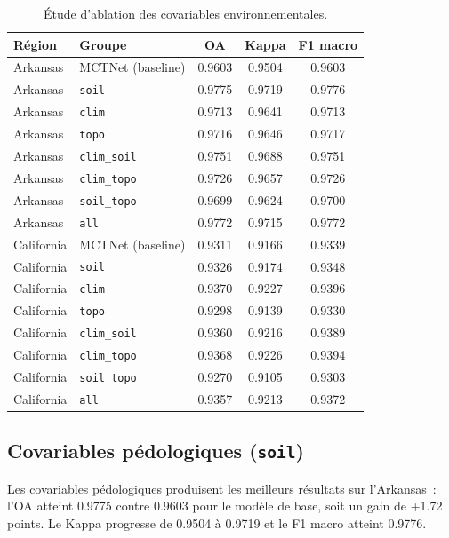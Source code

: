 \begin{table}[H]
\centering
\caption{Étude d'ablation des covariables environnementales.}
\label{tab:ablation_covariables}
\begin{tabular}{llccc}
\toprule
\textbf{Région} & \textbf{Groupe} & \textbf{OA} & \textbf{Kappa} & \textbf{F1 macro} \\
\midrule
Arkansas & MCTNet (baseline) & 0.9603 & 0.9504 & 0.9603 \\
Arkansas & \texttt{soil}      & 0.9775 & 0.9719 & 0.9776 \\
Arkansas & \texttt{clim}      & 0.9713 & 0.9641 & 0.9713 \\
Arkansas & \texttt{topo}      & 0.9716 & 0.9646 & 0.9717 \\
Arkansas & \texttt{clim\_soil}  & 0.9751 & 0.9688 & 0.9751 \\
Arkansas & \texttt{clim\_topo}  & 0.9726 & 0.9657 & 0.9726 \\
Arkansas & \texttt{soil\_topo}  & 0.9699 & 0.9624 & 0.9700 \\
Arkansas & \texttt{all}       & 0.9772 & 0.9715 & 0.9772 \\
\midrule
California & MCTNet (baseline) & 0.9311 & 0.9166 & 0.9339 \\
California & \texttt{soil}      & 0.9326 & 0.9174 & 0.9348 \\
California & \texttt{clim}      & 0.9370 & 0.9227 & 0.9396 \\
California & \texttt{topo}      & 0.9298 & 0.9139 & 0.9330 \\
California & \texttt{clim\_soil}  & 0.9360 & 0.9216 & 0.9389 \\
California & \texttt{clim\_topo}  & 0.9368 & 0.9226 & 0.9394 \\
California & \texttt{soil\_topo}  & 0.9270 & 0.9105 & 0.9303 \\
California & \texttt{all}       & 0.9357 & 0.9213 & 0.9372 \\
\bottomrule
\end{tabular}
\end{table}

\subsection{Covariables pédologiques (\texttt{soil})}

Les covariables pédologiques produisent les meilleurs résultats sur l'Arkansas~:
l'OA atteint 0.9775 contre 0.9603 pour le modèle de base, soit un gain de +1.72
points. Le Kappa progresse de 0.9504 à 0.9719 et le F1 macro atteint 0.9776.

